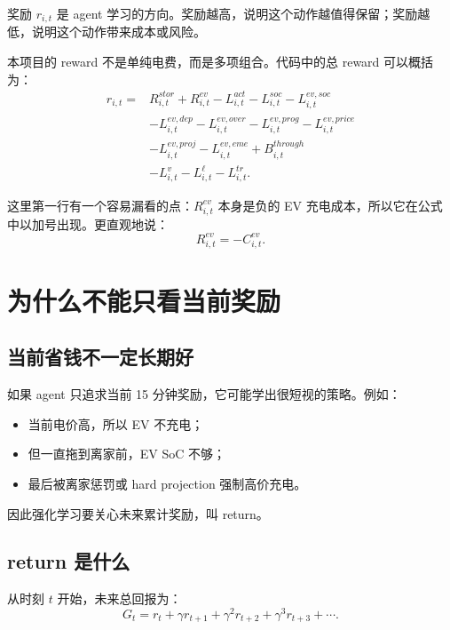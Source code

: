 \documentclass[UTF8,zihao=-4]{ctexart}
\begin{document}
奖励 $r_{i,t}$ 是 agent 学习的方向。奖励越高，说明这个动作越值得保留；奖励越低，说明这个动作带来成本或风险。

本项目的 reward 不是单纯电费，而是多项组合。代码中的总 reward 可以概括为：
\begin{equation}
\begin{aligned}
r_{i,t}
=&
R^{stor}_{i,t}
+ 
R^{ev}_{i,t}
-L^{act}_{i,t}
-L^{soc}_{i,t}
-L^{ev,soc}_{i,t}\\
&-L^{ev,dep}_{i,t}
-L^{ev,over}_{i,t}
-L^{ev,prog}_{i,t}
-L^{ev,price}_{i,t}\\
&-L^{ev,proj}_{i,t}
-L^{ev,eme}_{i,t}
+B^{through}_{i,t}\\
&-L^v_{i,t}
-L^\ell_{i,t}
-L^{tr}_{i,t}.
\end{aligned}
\end{equation}

这里第一行有一个容易漏看的点：$R^{ev}_{i,t}$ 本身是负的 EV 充电成本，所以它在公式中以加号出现。更直观地说：
\begin{equation}
R^{ev}_{i,t}=-C^{ev}_{i,t}.
\end{equation}

\section{为什么不能只看当前奖励}

\subsection{当前省钱不一定长期好}

如果 agent 只追求当前 15 分钟奖励，它可能学出很短视的策略。例如：
\begin{itemize}
  \item 当前电价高，所以 EV 不充电；
  \item 但一直拖到离家前，EV SoC 不够；
  \item 最后被离家惩罚或 hard projection 强制高价充电。
\end{itemize}

因此强化学习要关心未来累计奖励，叫 return。

\subsection{return 是什么}

从时刻 $t$ 开始，未来总回报为：
\begin{equation}
G_t
=
r_t+\gamma r_{t+1}+\gamma^2 r_{t+2}+\gamma^3 r_{t+3}+\cdots.
\end{equation}
\end{document}
